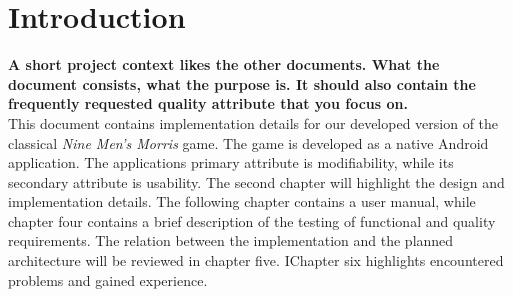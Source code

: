 \section{Introduction}

{\bf A short project context likes the other documents. What the document consists, what the purpose is. It should also contain the frequently requested quality attribute that you focus on.} \\

This document contains implementation details for our developed version of the classical \emph{Nine Men's Morris} game. The game is developed as a native Android application. The applications primary attribute is modifiability, while its secondary attribute is usability. The second chapter will highlight the design and implementation details. The following chapter contains a user manual, while chapter four contains a brief description of the testing of functional and quality requirements. The relation between the implementation and the planned architecture will be reviewed in chapter five. IChapter six highlights encountered problems and gained experience.




